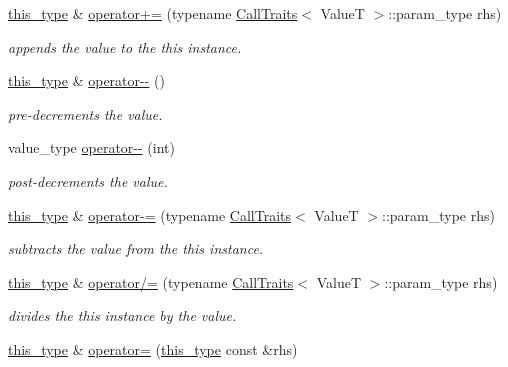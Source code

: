 \begin{DoxyCompactItemize}
\hyperlink{classhryky_1_1exclusion_1_1_atomic_writing_afc6301af19df5cf042e0cbed6d273b2a}{this\-\_\-type} \& \hyperlink{group__exclusion__control_gac0a6adb61a1a89d0a111bad5edb63eac}{operator+=} (typename \hyperlink{classhryky_1_1_call_traits}{Call\-Traits}$<$ Value\-T $>$\-::param\-\_\-type rhs)
\begin{DoxyCompactList}\small\item\em appends the value to the this instance. \end{DoxyCompactList}\item 
\hyperlink{classhryky_1_1exclusion_1_1_atomic_writing_afc6301af19df5cf042e0cbed6d273b2a}{this\-\_\-type} \& \hyperlink{group__exclusion__control_ga2eb1f0dc7165aaf81287e2a05ea05f41}{operator-\/-\/} ()
\begin{DoxyCompactList}\small\item\em pre-\/decrements the value. \end{DoxyCompactList}\item 
value\-\_\-type \hyperlink{group__exclusion__control_ga39cdbea957f1abd0251446989d3f82ec}{operator-\/-\/} (int)
\begin{DoxyCompactList}\small\item\em post-\/decrements the value. \end{DoxyCompactList}\item 
\hyperlink{classhryky_1_1exclusion_1_1_atomic_writing_afc6301af19df5cf042e0cbed6d273b2a}{this\-\_\-type} \& \hyperlink{group__exclusion__control_ga64d9930a9aaf9415d206872f01886685}{operator-\/=} (typename \hyperlink{classhryky_1_1_call_traits}{Call\-Traits}$<$ Value\-T $>$\-::param\-\_\-type rhs)
\begin{DoxyCompactList}\small\item\em subtracts the value from the this instance. \end{DoxyCompactList}\item 
\hyperlink{classhryky_1_1exclusion_1_1_atomic_writing_afc6301af19df5cf042e0cbed6d273b2a}{this\-\_\-type} \& \hyperlink{group__exclusion__control_ga298b802dc512f56b62eb79bdc842311d}{operator/=} (typename \hyperlink{classhryky_1_1_call_traits}{Call\-Traits}$<$ Value\-T $>$\-::param\-\_\-type rhs)
\begin{DoxyCompactList}\small\item\em divides the this instance by the value. \end{DoxyCompactList}\item 
\hyperlink{classhryky_1_1exclusion_1_1_atomic_writing_afc6301af19df5cf042e0cbed6d273b2a}{this\-\_\-type} \& \hyperlink{group__exclusion__control_ga4e15c7309396df54b08bf6d62c91ea98}{operator=} (\hyperlink{classhryky_1_1exclusion_1_1_atomic_writing_afc6301af19df5cf042e0cbed6d273b2a}{this\-\_\-type} const \&rhs)

\end{DoxyCompactItemize}
